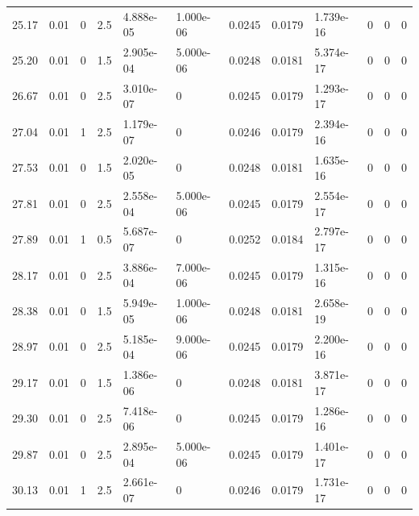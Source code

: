 \documentclass[preview]{standalone}
\begin{document}
{{{\begin{tabular}{L{1.2cm}C{1.2cm} C{0.3cm}C{0.5cm} C{1.4cm}C{1.4cm} C{1.4cm}C{1.4cm} C{1.6cm}C{1.6cm} C{1.6cm}C{1.6cm}}
  25.17  &  0.01  & 0     & 2.5 &  4.888e-05  & 1.000e-06  &  0.0245&   0.0179& 1.739e-16 & 0   &  0 & 0  \\ 
  25.20  &  0.01  & 0     & 1.5 &  2.905e-04  & 5.000e-06  &  0.0248&   0.0181& 5.374e-17 & 0   &  0 & 0  \\ 
  26.67  &  0.01  & 0     & 2.5 &  3.010e-07  & 0  &  0.0245&   0.0179& 1.293e-17 & 0   &  0 & 0  \\ 
  27.04  &  0.01  & 1     & 2.5 &  1.179e-07  & 0  &  0.0246&   0.0179& 2.394e-16 & 0   &  0 & 0  \\ 
  27.53  &  0.01  & 0     & 1.5 &  2.020e-05  & 0  &  0.0248&   0.0181& 1.635e-16 & 0   &  0 & 0  \\ 
  27.81  &  0.01  & 0     & 2.5 &  2.558e-04  & 5.000e-06  &  0.0245&   0.0179& 2.554e-17 & 0   &  0 & 0  \\ 
  27.89  &  0.01  & 1     & 0.5 &  5.687e-07  & 0  &  0.0252&   0.0184& 2.797e-17 & 0   &  0 & 0  \\ 
  28.17  &  0.01  & 0     & 2.5 &  3.886e-04  & 7.000e-06  &  0.0245&   0.0179& 1.315e-16 & 0   &  0 & 0  \\ 
  28.38  &  0.01  & 0     & 1.5 &  5.949e-05  & 1.000e-06  &  0.0248&   0.0181& 2.658e-19 & 0   &  0 & 0  \\ 
  28.97  &  0.01  & 0     & 2.5 &  5.185e-04  & 9.000e-06  &  0.0245&   0.0179& 2.200e-16 & 0   &  0 & 0  \\ 
  29.17  &  0.01  & 0     & 1.5 &  1.386e-06  & 0  &  0.0248&   0.0181& 3.871e-17 & 0   &  0 & 0  \\ 
  29.30  &  0.01  & 0     & 2.5 &  7.418e-06  & 0  &  0.0245&   0.0179& 1.286e-16 & 0   &  0 & 0  \\ 
  29.87  &  0.01  & 0     & 2.5 &  2.895e-04  & 5.000e-06  &  0.0245&   0.0179& 1.401e-17 & 0   &  0 & 0  \\ 
  30.13  &  0.01  & 1     & 2.5 &  2.661e-07  & 0  &  0.0246&   0.0179& 1.731e-17 & 0   &  0 & 0  \\ 
\hline 
\end{tabular} 

}}}
\end{document}
